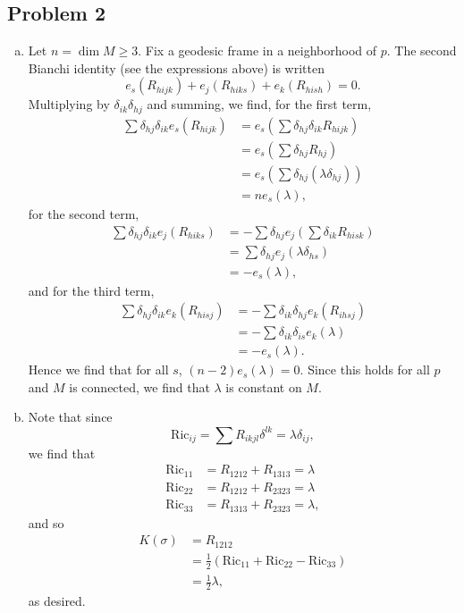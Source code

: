 \documentclass{../mathnotes}
\begin{document}
\subsection*{Problem 2}
\begin{enumerate}[(a)]
    \item Let $n=\dim M\geq 3$. Fix a geodesic frame in a neighborhood of $p$.
        The second Bianchi identity (see the expressions above) is written
        \[e_s( R_{hijk})+e_j(R_{hiks})+e_k(R_{hish})=0.\]
        Multiplying by $\delta_{ik}\delta_{hj}$ and summing, we find, for the
        first term,
        \begin{align*}
            \sum \delta_{hj}\delta_{ik}e_s(R_{hijk})&=e_s\left( \sum\delta_{hj}\delta_{ik}R_{hijk} \right)\\
            &=e_s\left( \sum\delta_{hj}R_{hj} \right)\\
            &=e_s\left( \sum\delta_{hj}(\lambda\delta_{hj}) \right)\\
            &=ne_s(\lambda),
        \end{align*}
        for the second term,
        \begin{align*}
            \sum \delta_{hj}\delta_{ik}e_j(R_{hiks}) &= -\sum\delta_{hj}e_j\left( \sum\delta_{ik}R_{hisk} \right)\\
            &=\sum\delta_{hj}e_j(\lambda\delta_{hs})\\
            &=-e_s(\lambda),
        \end{align*}
        and for the third term,
        \begin{align*}
            \sum\delta_{hj}\delta_{ik}e_k(R_{hisj}) &= -\sum\delta_{ik}\delta_{hj}e_k(R_{ihsj})\\
            &= -\sum\delta_{ik}\delta_{is}e_k(\lambda)\\
            &= -e_s(\lambda).
        \end{align*}
        Hence we find that for all $s$, $(n-2)e_s(\lambda)=0$. Since this holds for all $p$
        and $M$ is connected, we find that $\lambda$ is constant on $M$.
    \item Note that since
        \[\text{Ric}_{ij}=\sum R_{ikjl}\delta^{lk}=\lambda\delta_{ij},\]
        we find that
        \begin{align*}
            \text{Ric}_{11} &= R_{1212}+R_{1313}=\lambda\\
            \text{Ric}_{22} &= R_{1212}+R_{2323}=\lambda\\
            \text{Ric}_{33} &= R_{1313}+R_{2323}=\lambda,
        \end{align*}
        and so
        \begin{align*}
            K(\sigma) &= R_{1212}\\
            &= \frac{1}{2}\left( \text{Ric}_{11}+\text{Ric}_{22}-\text{Ric}_{33} \right)\\
            &=\frac{1}{2}\lambda,
        \end{align*}
        as desired.
\end{enumerate}
\end{document}
